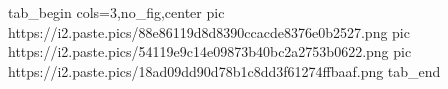  
 
 
 
 
\zzSecCmtScr

\ifcmt
  tab_begin cols=3,no_fig,center
     pic https://i2.paste.pics/88e86119d8d8390ccacde8376e0b2527.png
     pic https://i2.paste.pics/54119e9c14e09873b40bc2a2753b0622.png
     pic https://i2.paste.pics/18ad09dd90d78b1c8dd3f61274ffbaaf.png
  tab_end
\fi
